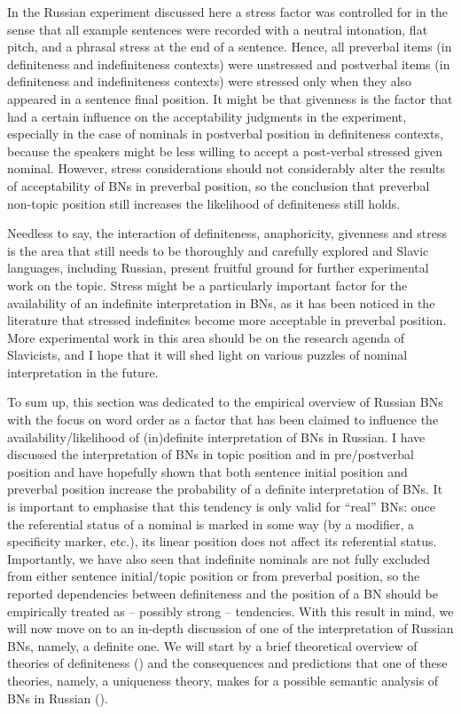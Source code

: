 \documentclass[output=paper,colorlinks,citecolor=brown]{langscibook}
\begin{document}
In the Russian experiment discussed here a stress factor was controlled for in the sense that all example sentences were recorded with a neutral intonation, flat pitch, and a phrasal stress at the end of a sentence. Hence, all preverbal items (in definiteness and indefiniteness contexts) were unstressed and postverbal items (in definiteness and indefiniteness contexts) were stressed only when they also appeared in a sentence final position. It might be that givenness is the factor that had a certain influence on the acceptability judgments in the experiment, especially in the case of nominals in postverbal position in definiteness contexts, because the speakers might be less willing to accept a post-verbal stressed given nominal. However, stress considerations should not considerably alter the results of acceptability of BNs in preverbal position, so the conclusion that preverbal non-topic position still increases the likelihood of definiteness still holds. 

Needless to say, the interaction of definiteness, anaphoricity, givenness and stress is the area that still needs to be thoroughly and carefully explored and Slavic languages, including Russian, present fruitful ground for further experimental work on the topic. Stress might be a particularly important factor for the availability of an indefinite interpretation in BNs, as it has been noticed in the literature that stressed indefinites become more acceptable in preverbal position. More experimental work in this area should be on the research agenda of Slavicists, and I hope that it will shed light on various puzzles of nominal interpretation in the future. 

To sum up, this section was dedicated to the empirical overview of Russian BNs with the focus on word order as a factor that has been claimed to influence the availability/likelihood of (in)definite interpretation of BNs in Russian. I have discussed the interpretation of BNs in topic position and in pre/postverbal position and have hopefully shown that both sentence initial position and preverbal position increase the probability of a definite interpretation of BNs. It is important to emphasise that this tendency is only valid for ``real'' BNs: once the referential status of a nominal is marked in some way (by a modifier, a specificity marker, etc.), its linear position does not affect its referential status. Importantly, we have also seen that indefinite nominals are not fully excluded from either sentence initial/topic position or from preverbal position, so the reported dependencies between definiteness and the position of a BN should be empirically treated as -- possibly strong -- tendencies. With this result in mind, we will now move on to an in-depth discussion of one of the interpretation of Russian BNs, namely, a definite one. We will start by a brief theoretical overview of theories of definiteness () and the consequences and predictions that one of these theories, namely, a uniqueness theory, makes for a possible semantic analysis of BNs in Russian (). 
\end{document}
